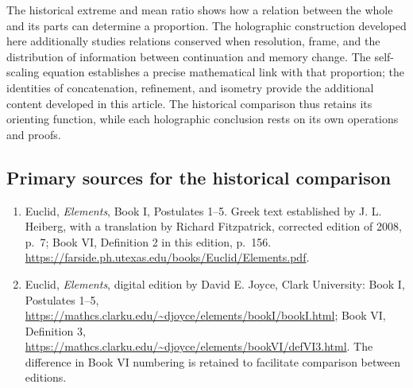 The historical extreme and mean ratio shows how a relation between the whole
and its parts can determine a proportion. The holographic construction
developed here additionally studies relations conserved when resolution,
frame, and the distribution of information between continuation and
memory change. The self-scaling equation establishes a precise mathematical
link with that proportion; the identities of concatenation, refinement, and
isometry provide the additional content developed in this article.
The historical comparison thus retains its orienting function, while
each holographic conclusion rests on its own operations and proofs.

\subsection*{Primary sources for the historical comparison}

\begin{enumerate}[label=\arabic*.]
 \item Euclid, \emph{Elements}, Book I, Postulates 1--5. Greek
 text established by J. L. Heiberg, with a translation by Richard Fitzpatrick,
 corrected edition of 2008, p.~7; Book VI, Definition 2 in this edition,
 p.~156. \url{https://farside.ph.utexas.edu/books/Euclid/Elements.pdf}.
 \item Euclid, \emph{Elements}, digital edition by David E. Joyce,
 Clark University: Book I, Postulates 1--5,
 \url{https://mathcs.clarku.edu/~djoyce/elements/bookI/bookI.html};
 Book VI, Definition 3,
 \url{https://mathcs.clarku.edu/~djoyce/elements/bookVI/defVI3.html}.
 The difference in Book VI numbering is retained to facilitate
 comparison between editions.
\end{enumerate}

